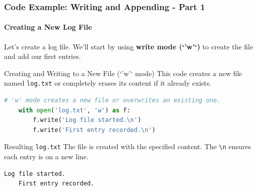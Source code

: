 \documentclass{beamer}
\begin{document}
\begin{frame}[fragile]
    \frametitle{Code Example: Writing and Appending - Part 1}
    \framesubtitle{Creating a New Log File}

    Let's create a log file. We'll start by using \textbf{write mode (`'w'`)} to create the file and add our first entries.
    \vspace{1em}

    \begin{block}{Creating and Writing to a New File (`'w'` mode)}
    This code creates a new file named \texttt{log.txt} or completely erases its content if it already exists.
    \begin{lstlisting}[language=Python]
    # 'w' mode creates a new file or overwrites an existing one.
    with open('log.txt', 'w') as f:
        f.write('Log file started.\n')
        f.write('First entry recorded.\n')
    \end{lstlisting}
    \end{block}
    
    \begin{block}{Resulting \texttt{log.txt}}
    The file is created with the specified content. The \texttt{\textbackslash n} ensures each entry is on a new line.
    \begin{lstlisting}[language=text]
    Log file started.
    First entry recorded.
    \end{lstlisting}
    \end{block}

\end{frame}
\end{document}
